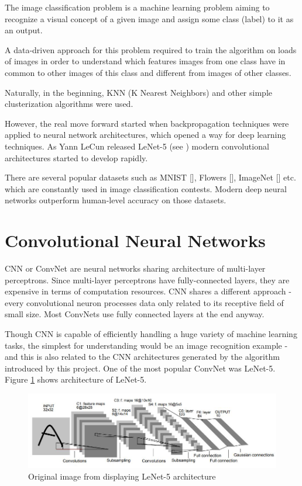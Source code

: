 The image classification problem is a machine learning problem aiming to recognize a visual concept of a given image and assign some class (label) to it as an output.

A data-driven approach for this problem required to train the algorithm on loads of images in order to understand which features images from one class have in common to other images of this class and different from images of other classes.

Naturally, in the beginning, KNN (K Nearest Neighbors) and other simple clusterization algorithms were used.

However, the real move forward started when backpropagation techniques were applied to neural network architectures, which opened a way for deep learning techniques. As Yann LeCun released LeNet-5  (see \cite{lecun-89c}) modern convolutional architectures started to develop rapidly.

There are several popular datasets such as MNIST [\cite{mnist}], Flowers [\cite{flowers}], ImageNet [\cite{imagenet}] etc. which are constantly used in image classification contests. Modern deep neural networks outperform human-level accuracy on those datasets.

\section{Convolutional Neural Networks}

CNN or ConvNet are neural networks sharing architecture of multi-layer perceptrons. Since multi-layer perceptrons have fully-connected layers, they are expensive in terms of computation resources. CNN shares a different approach - every convolutional neuron processes data only related to its receptive field of small size. Most ConvNets use fully connected layers at the end anyway.

Though CNN is capable of efficiently handling a huge variety of machine learning tasks, the simplest for understanding would be an image recognition example - and this is also related to the CNN architectures generated by the algorithm introduced by this project. One of the most popular ConvNet was LeNet-5. Figure \ref{fig:lenet} shows architecture of LeNet-5. 

\begin{figure}[!htb]
  \includegraphics[width=\linewidth]{images/lenetoriginal.jpg}
  \caption{Original image from \cite{lecun-89c} displaying LeNet-5 architecture}
  \label{fig:lenet}
\end{figure}

